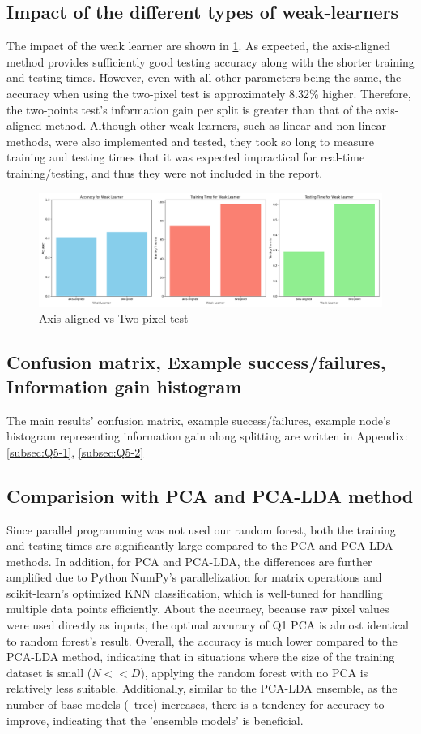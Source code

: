 \subsection{Impact of the different types of weak-learners}
The impact of the weak learner are shown in \cref{fig:q5-fig7}. As expected, the axis-aligned method provides sufficiently good testing accuracy along with the shorter training and testing times. However, even with all other parameters being the same, the accuracy when using the two-pixel test is approximately 8.32\% higher. Therefore, the two-points test's information gain per split is greater than that of the axis-aligned method. Although other weak learners, such as linear and non-linear methods, were also implemented and tested, they took so long to measure training and testing times that it was expected impractical for real-time training/testing, and thus they were not included in the report.
\begin{figure}
	\centering
	\includegraphics[width=0.8\linewidth]{image/q5-fig7.png}
	
	\caption{Axis-aligned vs Two-pixel test}
	\label{fig:q5-fig7}
\end{figure}


\subsection{Confusion matrix, Example success/failures, Information gain histogram}
The main results' confusion matrix, example success/failures, example node's histogram representing information gain along splitting are written in Appendix: \ref{subsec:Q5-1}, \ref{subsec:Q5-2}

\subsection{Comparision with PCA and PCA-LDA method}
Since parallel programming was not used our random forest, both the training and testing times are significantly large compared to the PCA and PCA-LDA methods. In addition, for PCA and PCA-LDA, the differences are further amplified due to Python NumPy’s parallelization for matrix operations and scikit-learn’s optimized KNN classification, which is well-tuned for handling multiple data points efficiently.
About the accuracy, because raw pixel values were used directly as inputs, the optimal accuracy of Q1 PCA is almost identical to random forest's result. Overall, the accuracy is much lower compared to the PCA-LDA method, indicating that in situations where the size of the training dataset is small ($N << D$), applying the random forest with no PCA is relatively less suitable. Additionally, similar to the PCA-LDA ensemble, as the number of base models (~tree) increases, there is a tendency for accuracy to improve, indicating that the 'ensemble models' is beneficial.
